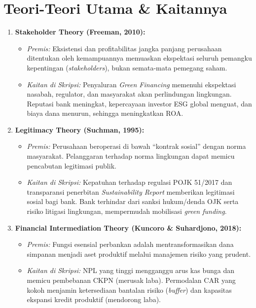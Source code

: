 \documentclass[11pt,a4paper]{article}
\begin{document}
\section{Teori-Teori Utama \& Kaitannya}

\begin{enumerate}
    \item \textbf{Stakeholder Theory (Freeman, 2010):}
    \begin{itemize}
        \item \textit{Premis:} Eksistensi dan profitabilitas jangka panjang perusahaan ditentukan oleh kemampuannya memuaskan ekspektasi seluruh pemangku kepentingan (\textit{stakeholders}), bukan semata-mata pemegang saham.
        \item \textit{Kaitan di Skripsi:} Penyaluran \textit{Green Financing} memenuhi ekspektasi nasabah, regulator, dan masyarakat akan perlindungan lingkungan. Reputasi bank meningkat, kepercayaan investor ESG global menguat, dan biaya dana menurun, sehingga meningkatkan ROA.
    \end{itemize}

    \item \textbf{Legitimacy Theory (Suchman, 1995):}
    \begin{itemize}
        \item \textit{Premis:} Perusahaan beroperasi di bawah ``kontrak sosial'' dengan norma masyarakat. Pelanggaran terhadap norma lingkungan dapat memicu pencabutan legitimasi publik.
        \item \textit{Kaitan di Skripsi:} Kepatuhan terhadap regulasi POJK 51/2017 dan transparansi penerbitan \textit{Sustainability Report} memberikan legitimasi sosial bagi bank. Bank terhindar dari sanksi hukum/denda OJK serta risiko litigasi lingkungan, mempermudah mobilisasi \textit{green funding}.
    \end{itemize}

    \item \textbf{Financial Intermediation Theory (Kuncoro \& Suhardjono, 2018):}
    \begin{itemize}
        \item \textit{Premis:} Fungsi esensial perbankan adalah mentransformasikan dana simpanan menjadi aset produktif melalui manajemen risiko yang prudent.
        \item \textit{Kaitan di Skripsi:} NPL yang tinggi mengganggu arus kas bunga dan memicu pembebanan CKPN (merusak laba). Permodalan CAR yang kokoh menjamin ketersediaan bantalan risiko (\textit{buffer}) dan kapasitas ekspansi kredit produktif (mendorong laba).
    \end{itemize}
\end{enumerate}
\end{document}
